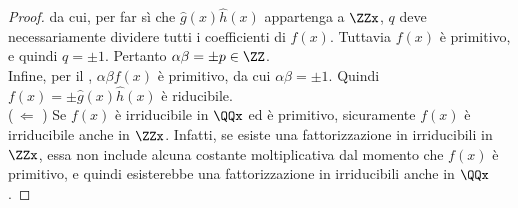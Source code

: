 \begin{proof}
    da cui, per far sì che $\hat{g}(x) \hat{h}(x)$ appartenga
    a $\ZZx$, $q$ deve necessariamente dividere tutti i
    coefficienti di $f(x)$. Tuttavia $f(x)$ è primitivo, e quindi
    $q=\pm 1$. Pertanto $\alpha \beta = \pm p \in \ZZ$. \\

    Infine, per il , $\alpha \beta f(x)$
    è primitivo, da cui $\alpha \beta = \pm 1$. Quindi
    $f(x) = \pm \hat{g}(x) \hat{h}(x)$ è riducibile. \\

    ($\,\Longleftarrow\,\,$)\; Se $f(x)$ è irriducibile in $\QQx$
    ed è primitivo, sicuramente $f(x)$ è irriducibile anche in
    $\ZZx$. Infatti, se esiste una fattorizzazione in
    irriducibili in $\ZZx$, essa non include alcuna costante
    moltiplicativa dal momento che $f(x)$ è primitivo, e quindi
    esisterebbe una fattorizzazione in irriducibili anche in $\QQx$.
\end{proof}